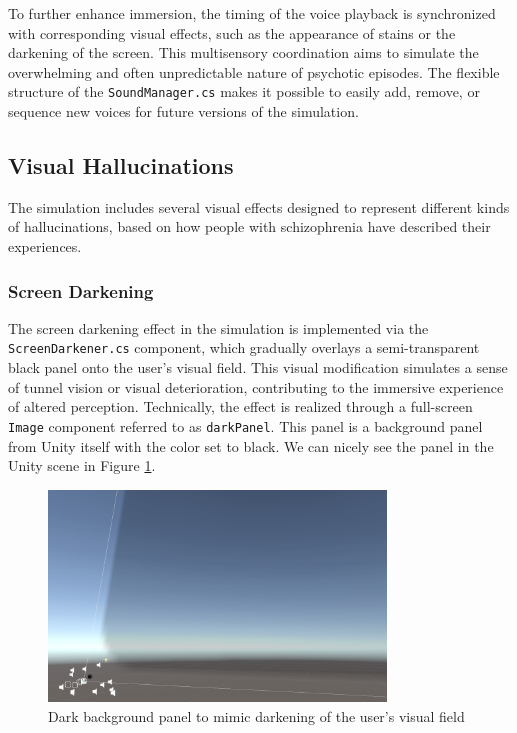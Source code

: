 \vspace{1em}
To further enhance immersion, the timing of the voice playback is synchronized with corresponding visual effects, such as the appearance of stains or the darkening of the screen. This multisensory coordination aims to simulate the overwhelming and often unpredictable nature of psychotic episodes. The flexible structure of the \texttt{SoundManager.cs} makes it possible to easily add, remove, or sequence new voices for future versions of the simulation.

\subsection{Visual Hallucinations}

The simulation includes several visual effects designed to represent different kinds of hallucinations, based on how people with schizophrenia have described their experiences. 

\subsubsection{Screen Darkening}

The screen darkening effect in the simulation is implemented via the \texttt{ScreenDarkener.cs} component, which gradually overlays a semi-transparent black panel onto the user's visual field. This visual modification simulates a sense of tunnel vision or visual deterioration, contributing to the immersive experience of altered perception. Technically, the effect is realized through a full-screen \texttt{Image} component referred to as \texttt{darkPanel}. This panel is a background panel from Unity itself with the color set to black. We can nicely see the panel in the Unity scene in Figure \ref{fig:darkpanel}. 

\begin{figure}[h!] 
    \centering 
    \includegraphics[width=0.8\textwidth]{../../Figures/darkpanel.jpg} 
    \caption{Dark background panel to mimic darkening of the user's visual field} 
    \label{fig:darkpanel} 
\end{figure}

